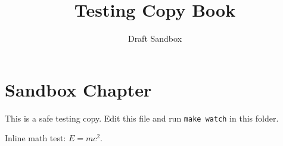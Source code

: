 \documentclass[11pt]{book}
\title{Testing Copy Book}
\author{Draft Sandbox}
\begin{document}
\maketitle
\tableofcontents
\chapter{Sandbox Chapter}
This is a safe testing copy. Edit this file and run \texttt{make watch} in this folder.

Inline math test: $E = mc^2$.
\end{document}

